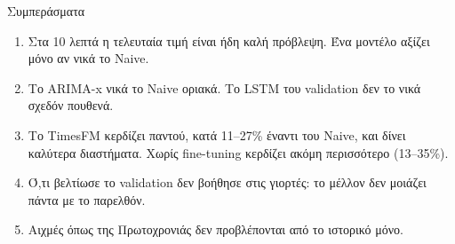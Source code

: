\documentclass[aspectratio=169,10pt]{beamer}
\begin{document}
\begin{frame}{Συμπεράσματα}
  \begin{enumerate}
    \item Στα 10 λεπτά η τελευταία τιμή είναι ήδη καλή πρόβλεψη. Ένα μοντέλο αξίζει μόνο αν \alert{νικά το Naive}.
    \vspace{0.5em}
    \item Το ARIMA-x νικά το Naive οριακά. Το LSTM του validation δεν το νικά σχεδόν πουθενά.
    \vspace{0.5em}
    \item Το \alert{TimesFM} κερδίζει παντού, κατά 11–27\% έναντι του Naive, και δίνει καλύτερα διαστήματα. Χωρίς fine-tuning κερδίζει ακόμη περισσότερο (13–35\%).
    \vspace{0.5em}
    \item Ό,τι βελτίωσε το validation δεν βοήθησε στις γιορτές: \alert{το μέλλον δεν μοιάζει πάντα με το παρελθόν}.
    \vspace{0.5em}
    \item Αιχμές όπως της Πρωτοχρονιάς δεν προβλέπονται από το ιστορικό μόνο.
  \end{enumerate}
\end{frame}
\end{document}
